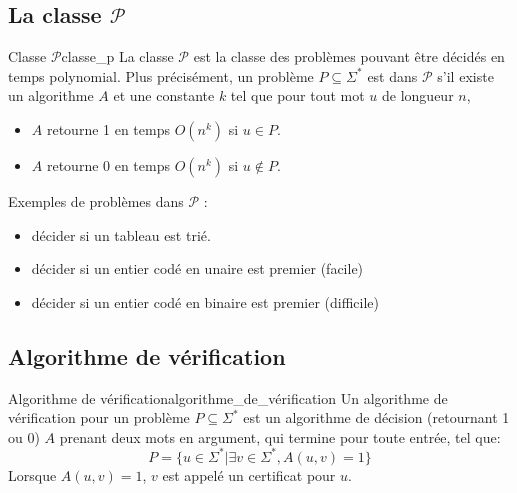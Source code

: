 \subsection{La classe $\mathcal{P}$}
\label{sub:la_classe_p}
\begin{definition}{Classe $\mathcal{P}$}{classe_p}
    La classe $\mathcal{P}$ est la classe des problèmes pouvant être décidés en temps polynomial. Plus précisément,
    un problème $P\subseteq\Sigma^*$ est dans $\mathcal{P}$ s'il existe un algorithme $A$ et une constante $k$ tel que
    pour tout mot $u$ de longueur $n$,
    \begin{itemize}[label=\textbullet]
        \item $A$ retourne 1 en temps $O(n^k)$ si $u\in P$.
        \item $A$ retourne 0 en temps $O(n^k)$ si $u\notin P$.
    \end{itemize}
\end{definition}
\begin{example}
    Exemples de problèmes dans $\mathcal{P}$ :
    \begin{itemize}[label=\textbullet]
        \item décider si un tableau est trié.
        \item décider si un entier codé en unaire est premier (facile)
        \item décider si un entier codé en binaire est premier (difficile)
    \end{itemize}
\end{example}


\subsection{Algorithme de vérification}
\label{sub:algorithme_de_verification}
\begin{definition}{Algorithme de vérification}{algorithme_de_vérification}
    Un algorithme de vérification pour un problème $P\subseteq\Sigma^*$ est un algorithme de décision (retournant 1 ou 0)
    $A$ prenant deux mots en argument, qui termine pour toute entrée, tel que:
    \begin{equation*}
        P = \{u\in\Sigma^* | \exists v \in \Sigma^*, A(u,v)=1\}
    \end{equation*}
    Lorsque $A(u,v)=1$, $v$ est appelé un certificat pour $u$.
\end{definition}

